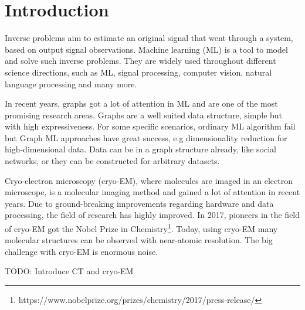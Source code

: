 \chapter{Introduction}
\label{sec:introduction}

Inverse problems aim to estimate an original signal that went through a system, based on output signal observations.
Machine learning (ML) is a tool to model and solve such inverse problems.
They are widely used throughout different science directions, such as ML,
signal processing, computer vision, natural language processing and many more.

In recent years, graphs got a lot of attention in ML and are one of the most promising research areas.
Graphs are a well suited data structure, simple but with high expressiveness. 
For some specific scenarios, ordinary ML algorithm fail but Graph ML approaches have great success, e.g dimensionality reduction for high-dimensional data.
Data can be in a graph structure already, like social networks, or they can be constructed for arbitrary datasets.

Cryo-electron microscopy (cryo-EM), where molecules are imaged in an electron microscope,
is a molecular imaging method and gained a lot of attention in recent years. 
Due to ground-breaking improvements regarding hardware and data processing, the field of research
has highly improved. In 2017, pioneers in the field of cryo-EM got the 
Nobel Prize in Chemistry\footnote{https://www.nobelprize.org/prizes/chemistry/2017/press-release/}.
Today, using cryo-EM many molecular structures can be observed with near-atomic resolution.
The big challenge with cryo-EM is enormous noise.

TODO: Introduce CT and cryo-EM







